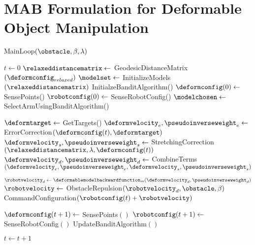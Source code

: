 \section{MAB Formulation for Deformable Object Manipulation}

        \begin{algorithm}[t]
            \caption{MainLoop$(\obstacle, \beta, \lambda)$}
            \begin{algorithmic}[1]
                \State $t \gets 0$
                \State $\relaxeddistancematrix \gets$ GeodesicDistanceMatrix$(\deformconfig_{relaxed})$
                \State $\modelset \gets$ InitializeModels$(\relaxeddistancematrix)$
                \State InitialzeBanditAlgorithm()
                \State $\deformconfig(0) \gets$ SensePoints()
                \State $\robotconfig(0) \gets$ SenseRobotConfig()
                    \State $\modelchosen \gets $ SelectArmUsingBanditAlgorithm()
                    
                    \State $\deformtarget \gets$ GetTargets()
                    \State $\deformvelocity_e, \pseudoinverseweight_e \gets$ ErrorCorrection$(\deformconfig(t), \deformtarget)$
                    \State $\deformvelocity_s, \pseudoinverseweight_s \gets$ StretchingCorrection$(\relaxeddistancematrix, \lambda, \deformconfig(t))$
                    \State $\deformvelocity_d, \pseudoinverseweight_d \gets$ CombineTerms$(\deformvelocity_e, \pseudoinverseweight_e, \deformvelocity_s, \pseudoinverseweight_s)$
        
                    \State $\robotvelocity_d \gets \deformablemodelbackwardfunction_m(\deformvelocity_d, \pseudoinverseweight_d)$
                    \State $\robotvelocity \gets$ ObstacleRepulsion$(\robotvelocity_d, \obstacle, \beta)$
                    \State CommandConfiguration$(\robotconfig(t) + \robotvelocity)$
        
                    \State $\deformconfig(t + 1) \gets$ SensePoints$()$
                    \State $\robotconfig(t + 1) \gets$ SenseRobotConfig$()$
                    \State UpdateBanditAlgorithm$()$
                    
                    \State $t \gets t + 1$
                \EndWhile
            \end{algorithmic}
            \label{alg:mainloop}
        \end{algorithm}

